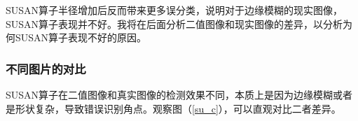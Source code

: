 \documentclass[a4paper,11pt,UTF8]{ctexart}
\begin{document}
SUSAN算子半径增加后反而带来更多误分类，说明对于边缘模糊的现实图像，SUSAN算子表现并不好。我将在后面分析二值图像和现实图像的差异，以分析为何SUSAN算子表现不好的原因。

\subsubsection{不同图片的对比}
SUSAN算子在二值图像和真实图像的检测效果不同，本质上是因为边缘模糊或者是形状复杂，导致错误识别角点。观察图（\ref{su_c}），可以直观对比二者差异。
\begin{figure}[htbp]
    \centering  %
\end{figure}
\end{document}
